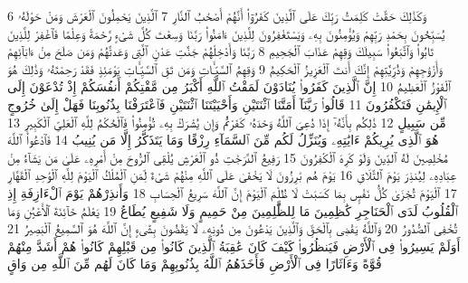 {\tiny\colorbox{cl_aya}{6}} وَكَذَٰلِكَ حَقَّتْ كَلِمَتُ رَبِّكَ عَلَى ٱلَّذِينَ كَفَرُوٓا۟ أَنَّهُمْ أَصْحَٰبُ ٱلنَّارِ
{\tiny\colorbox{cl_aya}{7}} ٱلَّذِينَ يَحْمِلُونَ ٱلْعَرْشَ وَمَنْ حَوْلَهُۥ يُسَبِّحُونَ بِحَمْدِ رَبِّهِمْ وَيُؤْمِنُونَ بِهِۦ وَيَسْتَغْفِرُونَ لِلَّذِينَ ءَامَنُوا۟ رَبَّنَا وَسِعْتَ كُلَّ شَىْءٍ رَّحْمَةً وَعِلْمًا فَٱغْفِرْ لِلَّذِينَ تَابُوا۟ وَٱتَّبَعُوا۟ سَبِيلَكَ وَقِهِمْ عَذَابَ ٱلْجَحِيمِ
{\tiny\colorbox{cl_aya}{8}} رَبَّنَا وَأَدْخِلْهُمْ جَنَّٰتِ عَدْنٍ ٱلَّتِى وَعَدتَّهُمْ وَمَن صَلَحَ مِنْ ءَابَآئِهِمْ وَأَزْوَٰجِهِمْ وَذُرِّيَّٰتِهِمْ إِنَّكَ أَنتَ ٱلْعَزِيزُ ٱلْحَكِيمُ
{\tiny\colorbox{cl_aya}{9}} وَقِهِمُ ٱلسَّيِّـَٔاتِ وَمَن تَقِ ٱلسَّيِّـَٔاتِ يَوْمَئِذٍ فَقَدْ رَحِمْتَهُۥ وَذَٰلِكَ هُوَ ٱلْفَوْزُ ٱلْعَظِيمُ
{\tiny\colorbox{cl_aya}{10}} إِنَّ ٱلَّذِينَ كَفَرُوا۟ يُنَادَوْنَ لَمَقْتُ ٱللَّهِ أَكْبَرُ مِن مَّقْتِكُمْ أَنفُسَكُمْ إِذْ تُدْعَوْنَ إِلَى ٱلْإِيمَٰنِ فَتَكْفُرُونَ
{\tiny\colorbox{cl_aya}{11}} قَالُوا۟ رَبَّنَآ أَمَتَّنَا ٱثْنَتَيْنِ وَأَحْيَيْتَنَا ٱثْنَتَيْنِ فَٱعْتَرَفْنَا بِذُنُوبِنَا فَهَلْ إِلَىٰ خُرُوجٍ مِّن سَبِيلٍ
{\tiny\colorbox{cl_aya}{12}} ذَٰلِكُم بِأَنَّهُۥٓ إِذَا دُعِىَ ٱللَّهُ وَحْدَهُۥ كَفَرْتُمْ وَإِن يُشْرَكْ بِهِۦ تُؤْمِنُوا۟ فَٱلْحُكْمُ لِلَّهِ ٱلْعَلِىِّ ٱلْكَبِيرِ
{\tiny\colorbox{cl_aya}{13}} هُوَ ٱلَّذِى يُرِيكُمْ ءَايَٰتِهِۦ وَيُنَزِّلُ لَكُم مِّنَ ٱلسَّمَآءِ رِزْقًا وَمَا يَتَذَكَّرُ إِلَّا مَن يُنِيبُ
{\tiny\colorbox{cl_aya}{14}} فَٱدْعُوا۟ ٱللَّهَ مُخْلِصِينَ لَهُ ٱلدِّينَ وَلَوْ كَرِهَ ٱلْكَٰفِرُونَ
{\tiny\colorbox{cl_aya}{15}} رَفِيعُ ٱلدَّرَجَٰتِ ذُو ٱلْعَرْشِ يُلْقِى ٱلرُّوحَ مِنْ أَمْرِهِۦ عَلَىٰ مَن يَشَآءُ مِنْ عِبَادِهِۦ لِيُنذِرَ يَوْمَ ٱلتَّلَاقِ
{\tiny\colorbox{cl_aya}{16}} يَوْمَ هُم بَٰرِزُونَ لَا يَخْفَىٰ عَلَى ٱللَّهِ مِنْهُمْ شَىْءٌ لِّمَنِ ٱلْمُلْكُ ٱلْيَوْمَ لِلَّهِ ٱلْوَٰحِدِ ٱلْقَهَّارِ
{\tiny\colorbox{cl_aya}{17}} ٱلْيَوْمَ تُجْزَىٰ كُلُّ نَفْسٍۭ بِمَا كَسَبَتْ لَا ظُلْمَ ٱلْيَوْمَ إِنَّ ٱللَّهَ سَرِيعُ ٱلْحِسَابِ
{\tiny\colorbox{cl_aya}{18}} وَأَنذِرْهُمْ يَوْمَ ٱلْءَازِفَةِ إِذِ ٱلْقُلُوبُ لَدَى ٱلْحَنَاجِرِ كَٰظِمِينَ مَا لِلظَّٰلِمِينَ مِنْ حَمِيمٍ وَلَا شَفِيعٍ يُطَاعُ
{\tiny\colorbox{cl_aya}{19}} يَعْلَمُ خَآئِنَةَ ٱلْأَعْيُنِ وَمَا تُخْفِى ٱلصُّدُورُ
{\tiny\colorbox{cl_aya}{20}} وَٱللَّهُ يَقْضِى بِٱلْحَقِّ وَٱلَّذِينَ يَدْعُونَ مِن دُونِهِۦ لَا يَقْضُونَ بِشَىْءٍ إِنَّ ٱللَّهَ هُوَ ٱلسَّمِيعُ ٱلْبَصِيرُ
{\tiny\colorbox{cl_aya}{21}} أَوَلَمْ يَسِيرُوا۟ فِى ٱلْأَرْضِ فَيَنظُرُوا۟ كَيْفَ كَانَ عَٰقِبَةُ ٱلَّذِينَ كَانُوا۟ مِن قَبْلِهِمْ كَانُوا۟ هُمْ أَشَدَّ مِنْهُمْ قُوَّةً وَءَاثَارًا فِى ٱلْأَرْضِ فَأَخَذَهُمُ ٱللَّهُ بِذُنُوبِهِمْ وَمَا كَانَ لَهُم مِّنَ ٱللَّهِ مِن وَاقٍ
